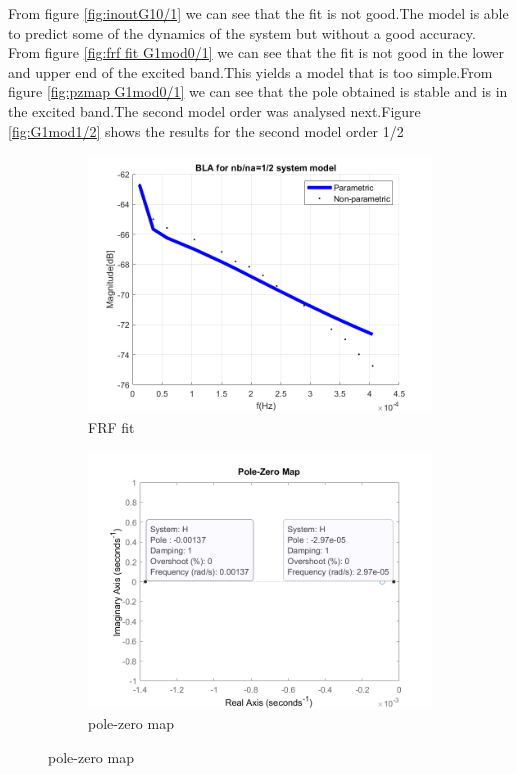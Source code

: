 \documentclass[a4paper,12pt]{article}
\numberwithin{equation}{section}
\begin{document}
\noindent
From figure \ref{fig:inoutG10/1} we can see that the fit is not good.The model is able to predict some of the dynamics of the system but without a good accuracy. From figure \ref{fig:frf fit G1mod0/1} we can see that the fit is not good in the lower and upper end of the excited band.This yields a model that is too simple.From figure \ref{fig:pzmap G1mod0/1} we can see that the pole obtained is stable and is in the excited band.The second model order was analysed next.Figure \ref{fig:G1mod1/2} shows the results for the second model order 1/2 

\begin{figure}[H]
\centering
\begin{subfigure}{.5\textwidth}
  \centering
  \includegraphics[width=.7\linewidth]{G1mod12FrfFit.png}
  \caption{FRF fit}
  \label{fig:frf fit G1mod1/2}
\end{subfigure}%
\begin{subfigure}{.5\textwidth}
  \centering
  \includegraphics[width=.7\linewidth]{G1mod12pzmap.png}
  \caption{pole-zero map}
  \label{fig:pzmap G1mod1/2}
\end{subfigure}


\end{figure}
\end{document}
